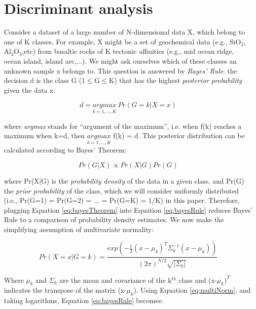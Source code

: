 \documentclass{article}
\begin{document}
\section{Discriminant analysis} \label{sec:discriminant}

Consider a  dataset of a large  number of N-dimensional  data X, which
belong  to one  of  K  classes.  For  example,  X might  be  a set  of
geochemical data (e.g.,  SiO$_2$, Al$_2$O$_3$,etc) from basaltic rocks
of K tectonic affinities (e.g.,  mid ocean ridge, ocean island, island
arc,...). We  might ask  ourselves which of  these classes  an unknown
sample x belongs to.  This  question is answered by {\it Bayes' Rule}:
the decision d  is the class G (1$\leq$G$\leq$K)  that has the highest
{\it posterior probability} given the data x:

\begin{equation}
  \label{eq:bayesRule}
  d = \underset{k=1,...,K}{argmax} ~ Pr(G=k|X=x)
\end{equation}

where {\it argmax}  stands for ``argument of the  maximum'', i.e. when
f(k) reaches  a maximum when  k=d, then $\underset{k=1,...,K}{argmax}$
f(k) = d.  This posterior  distribution can be calculated according to
Bayes' Theorem:

\begin{equation}
  \label{eq:bayesTheorem}
  Pr(G|X) \propto Pr(X|G)Pr(G)
\end{equation}

where  Pr(X$|$G) is the  {\it probability  density} of  the data  in a
given class, and Pr(G) the {\it prior probability} of the class, which
we  will consider  uniformly distributed  (i.e., Pr(G=1)  =  Pr(G=2) =
... = Pr(G=K)  = 1/K) in this paper.   Therefore, plugging Equation
\ref{eq:bayesTheorem}  into Equation  \ref{eq:bayesRule} reduces  Bayes' Rule
to a comparison of probability density estimates.  We now make
the simplifying assumption of multivariate normality:

\begin{equation}
  \label{eq:multiNorm}
  Pr(X=x|G=k) = \frac{exp \left( -\frac{1}{2}(x-\mu_k)^T\Sigma_k^{-1}(x-\mu_k) \right)}
                 {(2\pi)^{N/2}\sqrt{|\Sigma_k|}}
\end{equation}

Where  $\mu_k$ and  $\Sigma_k$  are  the mean  and  covariance of  the
k$^{th}$ class and (x-$\mu_k)^T$ indicates the transpose of the matrix
(x-$\mu_k$).    Using    Equation   \ref{eq:multiNorm},   and   taking
logarithms, Equation \ref{eq:bayesRule} becomes:
\end{document}
